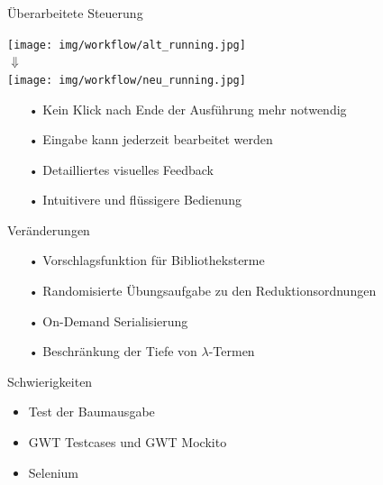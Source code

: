 \documentclass[10pt]{beamer}
\begin{document}
\begin{frame}{Überarbeitete Steuerung}
\begin{center}
\texttt{[image: img/workflow/alt\_running.jpg]}\\[0.4cm]

{\Huge $\Downarrow$}\\[0.4cm]

\texttt{[image: img/workflow/neu\_running.jpg]}

\begin{itemize}
	\item[•] Kein Klick nach Ende der Ausführung mehr notwendig
	\item[•] Eingabe kann jederzeit bearbeitet werden
	\item[•] Detailliertes visuelles Feedback
	\item[•] Intuitivere und flüssigere Bedienung
\end{itemize}
\end{center}
\end{frame}

\begin{frame}{Veränderungen}
\begin{itemize}
	\item[•] Vorschlagsfunktion für Bibliotheksterme
	\item[•] Randomisierte Übungsaufgabe zu den Reduktionsordnungen
	\item[•] On-Demand Serialisierung
	\item[•] Beschränkung der Tiefe von $\lambda$-Termen
\end{itemize}
\end{frame}

\begin{frame}{Schwierigkeiten}
\begin{itemize}
	\setlength{\itemsep}{10pt}
	\item Test der Baumausgabe
	\item GWT Testcases und GWT Mockito 
	\item Selenium
\end{itemize}
\end{frame}
\end{document}
